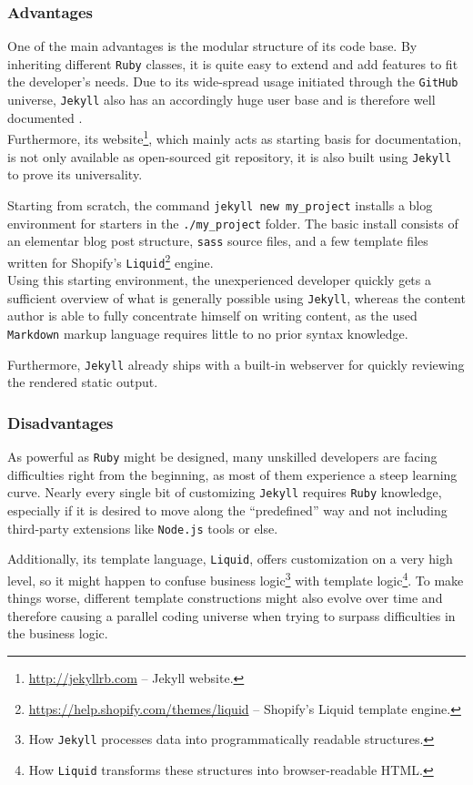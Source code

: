 \subsubsection{Advantages}
One of the main advantages is the modular structure of its code base. By inheriting different \texttt{Ruby} classes, it is quite easy to extend and add features to fit the developer's needs. Due to its wide-spread usage initiated through the \texttt{GitHub} universe, \texttt{Jekyll} also has an accordingly huge user base and is therefore well documented \cite[26]{dhillon2016}.\\ Furthermore, its website\footnote{\url{http://jekyllrb.com} -- Jekyll website.}, which mainly acts as starting basis for documentation, is not only available as open-sourced git repository, it is also built using \texttt{Jekyll} to prove its universality.

Starting from scratch, the command \texttt{jekyll new my\_project} installs a blog environment for starters in the \texttt{./my\_project} folder. The basic install consists of an elementar blog post structure, \texttt{sass} source files, and a few template files written for Shopify's \texttt{Liquid}\footnote{\url{https://help.shopify.com/themes/liquid} -- Shopify's Liquid template engine.} engine.\\
Using this starting environment, the unexperienced developer quickly gets a sufficient overview of what is generally possible using \texttt{Jekyll}, whereas the content author is able to fully concentrate himself on writing content, as the used \texttt{Markdown} markup language requires little to no prior syntax knowledge.

Furthermore, \texttt{Jekyll} already ships with a built-in webserver for quickly reviewing the rendered static output.

\subsubsection{Disadvantages}
As powerful as \texttt{Ruby} might be designed, many unskilled developers are facing difficulties right from the beginning, as most of them experience a steep learning curve. Nearly every single bit of customizing \texttt{Jekyll} requires \texttt{Ruby} knowledge, especially if it is desired to move along the ``predefined'' way and not including third-party extensions like \texttt{Node.js} tools or else.

Additionally, its template language, \texttt{Liquid}, offers customization on a very high level, so it might happen to confuse business logic\footnote{How \texttt{Jekyll} processes data into programmatically readable structures.} with template logic\footnote{How \texttt{Liquid} transforms these structures into browser-readable HTML.}. To make things worse, different template constructions might also evolve over time and therefore causing a parallel coding universe when trying to surpass difficulties in the business logic.

